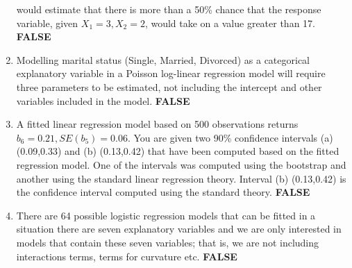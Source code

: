 \documentclass[10pt,landscape, fleqn]{article}
\begin{document}
\begin{multicols}{3}
\begin{enumerate}
				would estimate that there is more than a 50\% chance that the response
				variable, given $X_1 =3, X_2 = 2$, would take on a value greater than 17. \textbf{FALSE}
				\item Modelling marital status (Single, Married, Divorced) as a categorical	explanatory variable in a Poisson log-linear regression model will require three parameters to be estimated, not including the intercept and other variables included in the model. \textbf{FALSE}
				\item A fitted linear regression model based on 500 observations returns
				$b_6=0.21, SE(b_5)=0.06$. You are given two 90\% confidence intervals (a)	(0.09,0.33) and (b) (0.13,0.42) that have been computed based on the fitted regression model. One of the intervals was computed using the bootstrap and another using the standard linear regression theory. Interval (b) (0.13,0.42) is	the confidence interval computed using the standard theory. \textbf{FALSE}
				\item There are 64 possible logistic regression models that can be fitted in a situation there are seven explanatory variables and we are only interested in models that contain these seven variables; that is, we are not including interactions terms, terms for curvature etc. \textbf{FALSE}
			\end{enumerate}
	\end{multicols}
\end{document}
